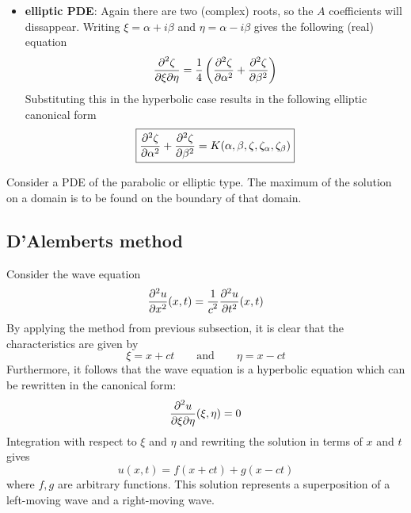 {\begin{itemize}
            \item \textbf{elliptic PDE}: Again there are two (complex) roots, so the $A$ coefficients will dissappear. Writing $\xi = \alpha + i\beta$ and $\eta = \alpha - i\beta$ gives the following (real) equation
            \[
            	\stylefrac{\partial^2\zeta}{\partial\xi\partial\eta} = \frac{1}{4}\left(\mpderiv{2}{\zeta}{\alpha} + \mpderiv{2}{\zeta}{\beta}\right)
            \]
            Substituting this in the hyperbolic case results in the following elliptic canonical form
            \begin{equation}
				\label{pde:elliptic_canonical_form}
                \boxed{\frac{\partial ^{2} \zeta}{\partial \alpha ^{2}} + \frac{\partial ^{2} \zeta}{\partial \beta ^{2}} = K(\alpha,\beta,\zeta,\zeta_\alpha,\zeta_\beta)}
			\end{equation}
		\end{itemize}
    }
    
    \begin{theorem}
    	\label{pde:theorem:maximum_principle}
		Consider a PDE of the parabolic or elliptic type. The maximum of the solution on a domain is to be found on the boundary of that domain. 
	\end{theorem}
    
\subsection{D'Alemberts method}
	Consider the wave equation
    \begin{equation}
    	\label{pde:wave_equation}
		\mpderiv{2}{u}{x}(x, t) = \stylefrac{1}{c^2}\mpderiv{2}{u}{t}(x, t)
	\end{equation}
    By applying the method from previous subsection, it is clear that the characteristics are given by
    \begin{equation}
		\xi = x + ct\qquad\text{and}\qquad \eta = x - ct
	\end{equation}
    Furthermore, it follows that the wave equation is a hyperbolic equation which can be rewritten in the canonical form:
    \begin{equation}
		\label{pde:canonical_wave_equation}
        \stylefrac{\partial^2u}{\partial\xi\partial\eta}(\xi,\eta) = 0
	\end{equation}
    Integration with respect to $\xi$ and $\eta$ and rewriting the solution in terms of $x$ and $t$ gives
    \begin{equation}
    	\label{pde:wave_solution}
		u(x, t) = f(x+ct) + g(x-ct)
	\end{equation}
    where $f, g$ are arbitrary functions. This solution represents a superposition of a left-moving wave and a right-moving wave.\par
    
